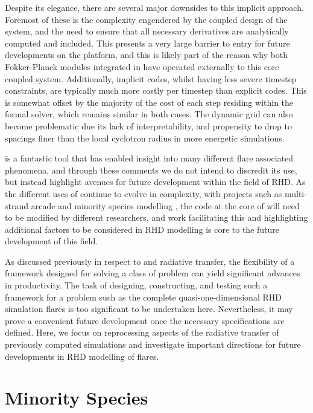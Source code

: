 Despite its elegance, there are several major downsides to this implicit approach.
Foremost of these is the complexity engendered by the coupled design of the system, and the need to ensure that all necessary derivatives are analytically computed and included.
This presents a very large barrier to entry for future developments on the platform, and this is likely part of the reason why both Fokker-Planck modules integrated in \Radyn{} have operated externally to this core coupled system.
Additionally, implicit codes, whilst having less severe timestep constraints, are typically much more costly per timestep than explicit codes.
This is somewhat offset by the majority of the cost of each step residing within the formal solver, which remains similar in both cases.
The dynamic grid can also become problematic due its lack of interpretability, and propensity to drop to spacings finer than the local cyclotron radius in more energetic simulations.

\Radyn{} is a fantastic tool that has enabled insight into many different flare associated phenomena, and through these comments we do not intend to discredit its use, but instead highlight avenues for future development within the field of RHD.
As the different uses of \Radyn{} continue to evolve in complexity, with projects such as multi-strand arcade and minority species modelling \NeedRef{}, the code at the core of \Radyn{} will need to be modified by different researchers, and work facilitating this and highlighting additional factors to be considered in RHD modelling is core to the future development of this field.

As discussed previously in respect to \Lw{} and radiative transfer, the flexibility of a framework designed for solving a class of problem can yield significant advances in productivity.
The task of designing, constructing, and testing such a framework for a problem such as the complete quasi-one-dimensional RHD simulation flares is too significant to be undertaken here.
Nevertheless, it may prove a convenient future development once the necessary specifications are defined.
Here, we focus on reprocessing aspects of the radiative transfer of previously computed \Radyn{} simulations and investigate important directions for future developments in RHD modelling of flares.

\section{Minority Species}

